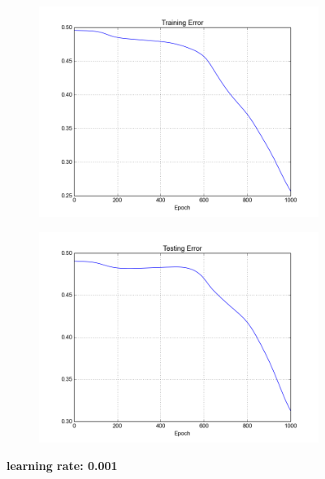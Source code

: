 \begin{figure}[h]	
	\begin{subfigure}[b]{0.5\textwidth}
		\includegraphics[width=\linewidth]{fig/trainingerror_lr0,001_eps0,05_regparam0,00_beta5_batch1.png}
	\end{subfigure}
	\begin{subfigure}[b]{0.5\textwidth}
		\includegraphics[width=\linewidth]{fig/valerror_lr0,001_eps0,05_regparam0,00_beta5_batch1.png}
	\end{subfigure}

	\caption{\textbf{learning rate: 0.001}}
\end{figure}

